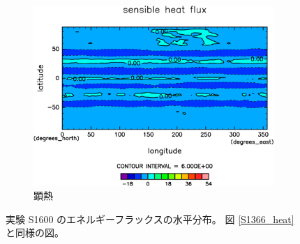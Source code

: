 \documentclass[body]{subfiles}
\begin{document}
\begin{figure}[t]
\begin{subfigure}{.4\textwidth}
		\includegraphics[width=\columnwidth]{S1600/Sens,time=3650:4015-crop-rotate.pdf}
		\caption{顕熱\hmu*{[W/m^{-2}]}}\label{S1600顕熱}
	\end{subfigure}
	\caption[実験 S1600 のエネルギーフラックスの水平分布]{
		実験 S1600 のエネルギーフラックスの水平分布。
		図 \ref{S1366_heat} と同様の図。
	}\label{S1600_heat}
\end{figure}
\end{document}
